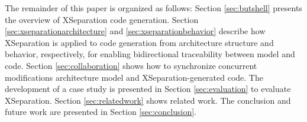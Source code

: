 The remainder of this paper is organized as follows: Section \ref{sec:butshell} presents the overview of XSeparation code generation. 
Section \ref{sec:xseparationarchitecture} and \ref{sec:xseparationbehavior} describe how XSeparation is applied to code generation from architecture structure and behavior, respectively, for enabling bidirectional traceability between model and code. 
Section \ref{sec:collaboration} shows how to synchronize concurrent modifications architecture model and XSeparation-generated code.
The development of a case study is presented in Section \ref{sec:evaluation} to evaluate XSeparation. 
Section \ref{sec:relatedwork} shows related work. 
The conclusion and future work are presented in Section \ref{sec:conclusion}.

